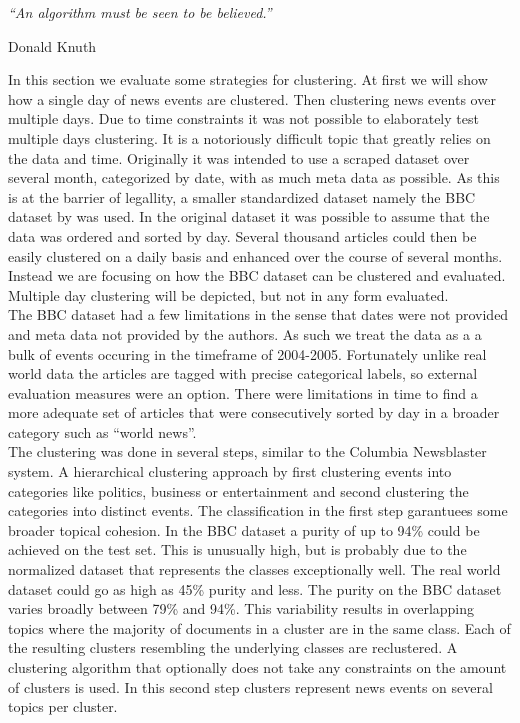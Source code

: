 \epigraph{\emph{
  ``An algorithm must be seen to be believed.''
}}{ Donald Knuth }

In this section we evaluate some strategies for clustering. At first we will show how a single day of news events are clustered. Then clustering news events over multiple days. Due to time constraints it was not possible to elaborately test multiple days clustering. It is a notoriously difficult topic that greatly relies on the data and time. Originally it was intended to use a scraped dataset over several month, categorized by date, with as much meta data as possible. As this is at the barrier of legallity, a smaller standardized dataset namely the BBC dataset by \cite{BBCData2006} was used. In the original dataset it was possible to assume that the data was ordered and sorted by day. Several thousand articles could then be easily clustered on a daily basis and enhanced over the course of several months. Instead we are focusing on how the BBC dataset can be clustered and evaluated. Multiple day clustering will be depicted, but not in any form evaluated.\\

The BBC dataset had a few limitations in the sense that dates were not provided and meta data not provided by the authors. As such we treat the data as a a bulk of events occuring in the timeframe of 2004-2005. Fortunately unlike real world data the articles are tagged with precise categorical labels, so external evaluation measures were an option. There were limitations in time to find a more adequate set of articles that were consecutively sorted by day in a broader category such as ``world news''.\\

The clustering was done in several steps, similar to the Columbia Newsblaster system.\cite{NewsBlaster2002} A hierarchical clustering approach by first clustering events into categories like politics, business or entertainment and second clustering the categories into distinct events. The classification in the first step garantuees some broader topical cohesion. In the BBC dataset a purity of up to 94\% could be achieved on the test set. This is unusually high, but is probably due to the normalized dataset that represents the classes exceptionally well. The real world dataset could go as high as 45\% purity and less. The purity on the BBC dataset varies broadly between 79\% and 94\%. This variability results in overlapping topics where the majority of documents in a cluster are in the same class. Each of the resulting clusters resembling the underlying classes are reclustered. A clustering algorithm that optionally does not take any constraints on the amount of clusters is used. In this second step clusters represent news events on several topics per cluster.\\

